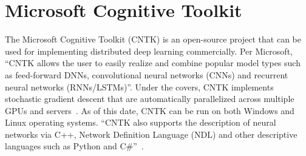 \section{Microsoft Cognitive Toolkit}

The Microsoft Cognitive Toolkit (CNTK) is an open-source project that can be used for implementing distributed deep learning commercially. Per Microsoft, ``CNTK allows the user to easily realize and combine popular model types such as feed-forward DNNs, convolutional neural networks (CNNs) and recurrent neural networks (RNNs/LSTMs)''. Under the covers, CNTK implements stochastic gradient descent that are automatically parallelized across multiple GPUs and servers~\cite{hid-sp18-510-web-cntk}. As of this date, CNTK can be run on both Windows and Linux operating systems. ``CNTK also supports the description of neural networks via C++, Network Definition Language (NDL) and other descriptive languages such as Python and C\#''~\cite{hid-sp18-510-kd-cntk}.
